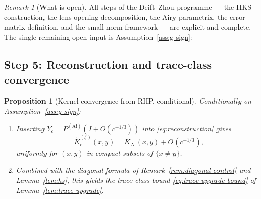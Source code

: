 \documentclass[12pt,a4paper]{amsart}
\newtheorem{proposition}[theorem]{Proposition}
\theoremstyle{definition}
\theoremstyle{remark}
\newtheorem{remark}[theorem]{Remark}
\begin{document}
\begin{remark}[What is open]
\label{rem:what-is-open}
All steps of the Deift--Zhou programme --- the IIKS construction,
the lens-opening decomposition, the Airy parametrix, the error matrix
definition, and the small-norm framework --- are explicit and complete.
The single remaining open input is Assumption~\ref{ass:g-sign}:
\begin{center}
\end{center}
\end{remark}

\subsection{Step 5: Reconstruction and trace-class convergence}

\begin{proposition}[Kernel convergence from RHP, conditional]
\label{prop:kernel-from-rhp}
Conditionally on Assumption~\ref{ass:g-sign}:
\begin{enumerate}[label=(\roman*)]
\item Inserting $Y_c=P^{(\mathrm{Ai})}(I+O(c^{-1/3}))$ into
  \eqref{eq:reconstruction} gives
  \[
    \widetilde K_c^{(\xi)}(x,y)=K_{\mathrm{Ai}}(x,y)+O(c^{-1/3}),
  \]
  uniformly for $(x,y)$ in compact subsets of $\{x\neq y\}$.
\item Combined with the diagonal formula of
  Remark~\ref{rem:diagonal-control} and Lemma~\ref{lem:hs},
  this yields the trace-class bound
  \eqref{eq:trace-upgrade-bound} of Lemma~\ref{lem:trace-upgrade}.
\end{enumerate}
\end{proposition}
\end{document}
